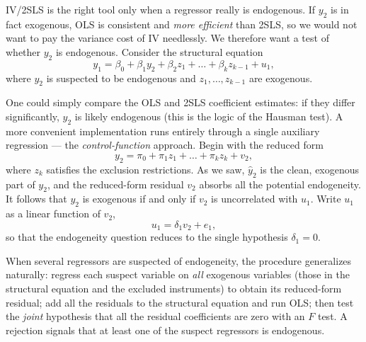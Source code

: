 IV/2SLS is the right tool only when a regressor really is endogenous. If $y_2$ is in fact exogenous, OLS is consistent and \emph{more efficient} than 2SLS, so we would not want to pay the variance cost of IV needlessly. We therefore want a test of whether $y_2$ is endogenous. Consider the structural equation
\[
y_1 = \beta_0 + \beta_1 y_2 + \beta_2 z_1 + \dots + \beta_k z_{k-1} + u_1,
\]
where $y_2$ is suspected to be endogenous and $z_1,\dots,z_{k-1}$ are exogenous.

One could simply compare the OLS and 2SLS coefficient estimates: if they differ significantly, $y_2$ is likely endogenous (this is the logic of the Hausman test). A more convenient implementation runs entirely through a single auxiliary regression --- the \emph{control-function} approach. Begin with the reduced form
\[
y_2 = \pi_0 + \pi_1 z_1 + \dots + \pi_k z_k + v_2,
\]
where $z_k$ satisfies the exclusion restrictions. As we saw, $\widehat y_2$ is the clean, exogenous part of $y_2$, and the reduced-form residual $v_2$ absorbs all the potential endogeneity. It follows that $y_2$ is exogenous if and only if $v_2$ is uncorrelated with $u_1$. Write $u_1$ as a linear function of $v_2$,
\[
u_1 = \delta_1 v_2 + e_1,
\]
so that the endogeneity question reduces to the single hypothesis $\delta_1 = 0$.


When several regressors are suspected of endogeneity, the procedure generalizes naturally: regress each suspect variable on \emph{all} exogenous variables (those in the structural equation and the excluded instruments) to obtain its reduced-form residual; add all the residuals to the structural equation and run OLS; then test the \emph{joint} hypothesis that all the residual coefficients are zero with an $F$ test. A rejection signals that at least one of the suspect regressors is endogenous.

